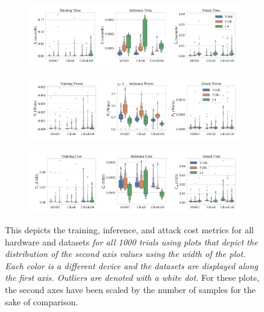 \documentclass[conference]{IEEEtran}
\newcommand{\cm}[1]{\textit{{\color{blue}#1}}}
\begin{document}
\begin{figure}[h]
    \centering
    \begin{subfigure}[b]{.8\textwidth}
        \includegraphics[width=\linewidth,clip]{plots/combined/time.pdf}
        \caption{}
        \label{fig:time}
    \end{subfigure}
    \begin{subfigure}[b]{.8\textwidth}
        \includegraphics[width=\linewidth,clip]{plots/combined/power.pdf}
        \caption{}
        \label{fig:power}
    \end{subfigure}
    \begin{subfigure}[b]{.8\textwidth}
        \includegraphics[width=\linewidth,clip]{plots/combined/cost.pdf}
        \caption{}
        \label{fig:cost}
    \end{subfigure}
    \caption{This depicts the training, inference, and attack cost metrics for all hardware and datasets \cm{ for all 1000 trials using plots that depict the distribution of the second axis values using the width of the plot. Each color is a different device and the datasets are displayed along the first axis. Outliers are denoted with a white dot.}
    For these plots, the second axes have been scaled by the number of samples for the sake of comparison.}
\end{figure}
\end{document}
